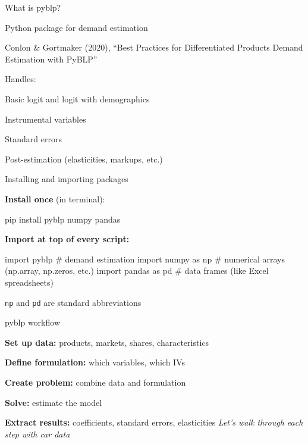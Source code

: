 \documentclass[notes,11pt, aspectratio=169]{beamer}
\newenvironment{wideitemize}{\itemize\addtolength{\itemsep}{10pt}}{\enditemize}
\newenvironment{wideenumerate}{\enumerate\addtolength{\itemsep}{10pt}}{\endenumerate}
\begin{document}
\begin{frame}{What is pyblp?}
	\begin{wideitemize}
		\item Python package for demand estimation
		\item Conlon \& Gortmaker (2020), ``Best Practices for Differentiated Products Demand Estimation with PyBLP''
		\item Handles:
		\begin{wideitemize}
			\vspace{5pt}
			\item Basic logit and logit with demographics
			\item Instrumental variables
			\item Standard errors
			\item Post-estimation (elasticities, markups, etc.)
		\end{wideitemize}
	\end{wideitemize}
\end{frame}

\begin{frame}[fragile]{Installing and importing packages}
	\begin{wideitemize}
		\item \textbf{Install once} (in terminal):
	\end{wideitemize}
\begin{pycode}
pip install pyblp numpy pandas
\end{pycode}
	\vspace{5pt}
	\begin{wideitemize}
		\item \textbf{Import at top of every script:}
	\end{wideitemize}
\begin{pycode}
import pyblp       # demand estimation
import numpy as np # numerical arrays (np.array, np.zeros, etc.)
import pandas as pd # data frames (like Excel spreadsheets)
\end{pycode}
	\vspace{5pt}
	\begin{wideitemize}
		\item \texttt{np} and \texttt{pd} are standard abbreviations
	\end{wideitemize}
\end{frame}

\begin{frame}{pyblp workflow}
	\begin{wideenumerate}
		\item \textbf{Set up data:} products, markets, shares, characteristics
		\item \textbf{Define formulation:} which variables, which IVs
		\item \textbf{Create problem:} combine data and formulation
		\item \textbf{Solve:} estimate the model
		\item \textbf{Extract results:} coefficients, standard errors, elasticities
	\end{wideenumerate}
	\vspace{11pt}
	\textit{Let's walk through each step with car data}
\end{frame}
\end{document}
